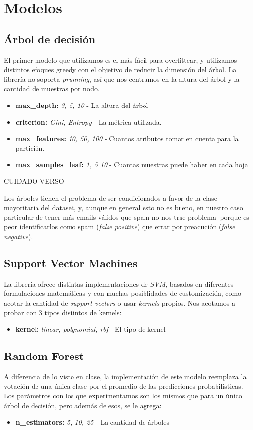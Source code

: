 \section{Modelos}
\subsection{Árbol de decisión}
El primer modelo que utilizamos es el más fácil para overfittear, y utilizamos distintos efoques greedy con el objetivo de reducir la dimensión del árbol. La librería no soporta \textit{prunning}, así que nos centramos en la altura del árbol y la cantidad de muestras por nodo. 
\begin{itemize}
\item \textbf{max\_depth:} \textit{3, 5, 10} - La altura del árbol
\item \textbf{criterion:} \textit{Gini, Entropy} - La métrica utilizada.
\item \textbf{max\_features:} \textit{10, 50, 100} - Cuantos atributos tomar en cuenta para la partición.
\item \textbf{max\_samples\_leaf:} \textit{1, 5 10} - Cuantas muestras puede haber en cada hoja
\end{itemize}
{\Large CUIDADO VERSO}

Los árboles tienen el problema de ser condicionados a favor de la clase mayoritaria del dataset, y, aunque en general esto no es bueno, en nuestro caso particular de tener más emails válidos que spam no nos trae problema, porque es peor identificarlos como spam (\textit{false positive}) que errar por preacución (\textit{false negative}).  

\subsection{Support Vector Machines}
La librería ofrece distintas implementaciones de \textit{SVM}, basados en diferentes formulaciones matemáticas y con muchas posiblidades de customización, como acotar la cantidad de \textit{support vectors} o usar \textit{kernels} propios. Nos acotamos a probar con 3 tipos distintos de kernels:
\begin{itemize}
\item \textbf{kernel:} \textit{linear, polynomial, rbf} - El tipo de kernel
\end{itemize}

\subsection{Random Forest}
A diferencia de lo visto en clase, la implementación de este modelo reemplaza la votación de una única clase por el promedio de las predicciones probabilísticas. Los parámetros con los que experimentamos son los mismos que para un único árbol de decisión, pero además de esos, se le agrega:
\begin{itemize}
\item \textbf{n\_estimators:} \textit{5, 10, 25} - La cantidad de árboles
\end{itemize}
